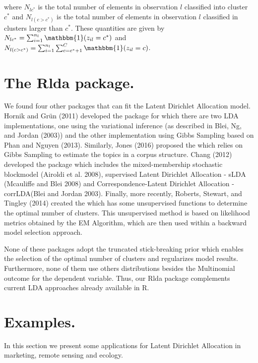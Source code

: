 \documentclass[article]{jss}
\begin{document}
\noindent where \(N_{lc^{*}}\) is the total number of elements in
observation \(l\) classified into cluster \(c^{*}\) and
\(N_{l(c>c^{*})}\) is the total number of elements in observation \(l\)
classified in clusters larger than \(c^{*}\). These quantities are given
by \(N_{lc^{*}}=\sum_{i=1}^{n_{l}}\mathbbm{1}(z_{il}=c^{*})\) and
\(N_{l(c>c^{*})}=\sum_{i=1}^{n_{l}}\sum_{c=c^{*}+1}^{C}\mathbbm{1}(z_{il}=c)\).

\section{The Rlda package.}\label{the-rlda-package.}

We found four other packages that can fit the Latent Dirichlet
Allocation model. Hornik and Grün (2011) developed the 
package for which there are two LDA implementations, one using the
variational inference (as described in Blei, Ng, and Jordan (2003)) and
the other implementation using Gibbs Sampling based on Phan and Nguyen
(2013). Similarly, Jones (2016) proposed the  which
relies on Gibbs Sampling to estimate the topics in a corpus structure.
Chang (2012) developed the  package which includes the
mixed-membership stochastic blockmodel (Airoldi et al. 2008), supervised
Latent Dirichlet Allocation - sLDA (Mcauliffe and Blei 2008) and
Correspondence-Latent Dirichlet Allocation - corrLDA(Blei and Jordan
2003). Finally, more recently, Roberts, Stewart, and Tingley (2014)
created the  which has some unsupervised functions to determine
the optimal number of clusters. This unsupervised method is based on
likelihood metrics obtained by the EM Algorithm, which are then used
within a backward model selection approach.

None of these packages adopt the truncated stick-breaking prior which
enables the selection of the optimal number of clusters and regularizes
model results. Furthermore, none of them use others distributions
besides the Multinomial outcome for the dependent variable. Thus, our
Rlda package complements current LDA approaches already available in R.

\section{Examples.}\label{examples.}

In this section we present some applications for Latent Dirichlet
Allocation in marketing, remote sensing and ecology.
\end{document}
